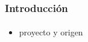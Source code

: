 \frame
{
\frametitle{Introducción}
\framesubtitle{}
\begin{itemize}
	\item proyecto y origen
\end{itemize}
}
